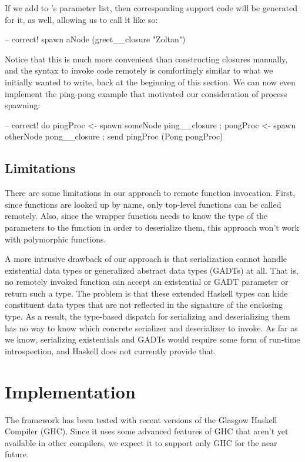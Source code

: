 \documentclass[preprint]{sigplanconf}
\begin{document}
If we add  to 's parameter list, then corresponding support code will be generated for it, as well, allowing us to call it like so:

\begin{code}
-- correct!
spawn aNode (greet__closure "Zoltan")
\end{code}

Notice that this is much more convenient than constructing closures manually, and the syntax to invoke code remotely is comfortingly similar to what we initially wanted to write, back at the beginning of this section. We can now even implement the ping-pong example that motivated our consideration of process spawning:

\begin{code}
-- correct!
do { pingProc <- spawn someNode ping__closure
   ; pongProc <- spawn otherNode pong__closure
   ; send pingProc (Pong pongProc) }
\end{code}

\subsection{Limitations}

There are some limitations in our approach to remote function invocation. First, since functions are looked up by name, only top-level functions can be called remotely. Also, since the wrapper function needs to know the type of the parameters to the function in order to deserialize them, this approach won't work with polymorphic functions.

A more intrusive drawback of our approach is that serialization cannot handle existential data types or generalized abstract data types (GADTs) at all. That is, no remotely invoked function can accept an existential or GADT parameter or return such a type. The problem is that these extended Haskell types can hide constituent data types that are not reflected in the signature of the enclosing type. As a result, the type-based dispatch for serializing and deserializing them has no way to know which concrete serializer and deserializer to invoke. As far as we know, serializing existentials and GADTs would require some form of run-time introspection, and Haskell does not currently provide that.


\section{Implementation}
The framework has been tested with recent versions of the Glasgow Haskell Compiler (GHC). Since it uses some advanced features of GHC that aren't yet available in other compilers, we expect it to support only GHC for the near future.
\end{document}
